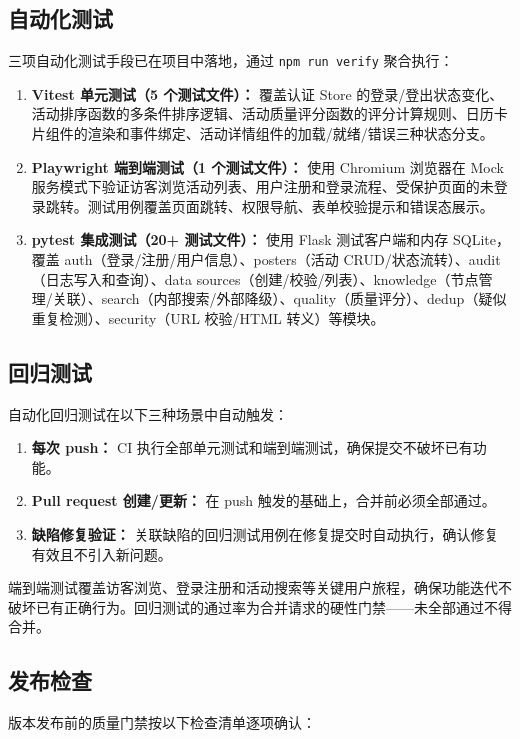 \documentclass[12pt,a4paper]{ctexart}
\begin{document}
\subsection{自动化测试}
三项自动化测试手段已在项目中落地，通过 \texttt{npm run verify} 聚合执行：
\begin{enumerate}
\item \textbf{Vitest 单元测试（5 个测试文件）：} 覆盖认证 Store 的登录/登出状态变化、活动排序函数的多条件排序逻辑、活动质量评分函数的评分计算规则、日历卡片组件的渲染和事件绑定、活动详情组件的加载/就绪/错误三种状态分支。
\item \textbf{Playwright 端到端测试（1 个测试文件）：} 使用 Chromium 浏览器在 Mock 服务模式下验证访客浏览活动列表、用户注册和登录流程、受保护页面的未登录跳转。测试用例覆盖页面跳转、权限导航、表单校验提示和错误态展示。
\item \textbf{pytest 集成测试（20+ 测试文件）：} 使用 Flask 测试客户端和内存 SQLite，覆盖 auth（登录/注册/用户信息）、posters（活动 CRUD/状态流转）、audit（日志写入和查询）、data sources（创建/校验/列表）、knowledge（节点管理/关联）、search（内部搜索/外部降级）、quality（质量评分）、dedup（疑似重复检测）、security（URL 校验/HTML 转义）等模块。
\end{enumerate}

\subsection{回归测试}
自动化回归测试在以下三种场景中自动触发：
\begin{enumerate}
\item \textbf{每次 push：} CI 执行全部单元测试和端到端测试，确保提交不破坏已有功能。
\item \textbf{Pull request 创建/更新：} 在 push 触发的基础上，合并前必须全部通过。
\item \textbf{缺陷修复验证：} 关联缺陷的回归测试用例在修复提交时自动执行，确认修复有效且不引入新问题。
\end{enumerate}
端到端测试覆盖访客浏览、登录注册和活动搜索等关键用户旅程，确保功能迭代不破坏已有正确行为。回归测试的通过率为合并请求的硬性门禁——未全部通过不得合并。

\subsection{发布检查}
版本发布前的质量门禁按以下检查清单逐项确认：
\end{document}
